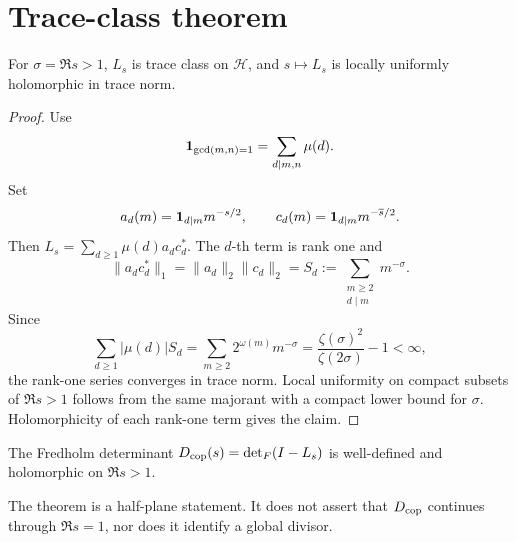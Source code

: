 \section{Trace-class theorem}

\begin{theorem}
For \(\sigma=\Re s>1\), \(L_s\) is trace class on \(\mathcal H\), and
\(s\mapsto L_s\) is locally uniformly holomorphic in trace norm.
\end{theorem}

\begin{proof}
Use
\[
\mathbf{1}_{\operatorname{gcd}(m,n)=1}=\sum_{d\mid m,n}\mu(d).
\]
Set
\[
a_d(m)=\mathbf{1}_{d\mid m}m^{-s/2},\qquad
c_d(m)=\mathbf{1}_{d\mid m}m^{-\overline{s}/2}.
\]
Then \(L_s=\sum_{d\geq1}\mu(d)a_dc_d^*\).  The \(d\)-th term is rank one and
\[
\lVert a_dc_d^*\rVert_1
=\lVert a_d\rVert_2\lVert c_d\rVert_2
=S_d:=\sum_{\substack{m\geq2\\d\mid m}}m^{-\sigma}.
\]
Since
\[
\sum_{d\geq1}|\mu(d)|S_d
=\sum_{m\geq2}2^{\omega(m)}m^{-\sigma}
=\frac{\zeta(\sigma)^2}{\zeta(2\sigma)}-1<\infty,
\]
the rank-one series converges in trace norm.  Local uniformity on compact
subsets of \(\Re s>1\) follows from the same majorant with a compact lower
bound for \(\sigma\).  Holomorphicity of each rank-one term gives the claim.
\end{proof}

\begin{corollary}
The Fredholm determinant \(D_{\mathrm{cop}}(s)=\operatorname{det}_{F}(I-L_s)\) is well-defined and
holomorphic on \(\Re s>1\).
\end{corollary}

\begin{remark}
The theorem is a half-plane statement.  It does not assert that \(D_{\mathrm{cop}}\)
continues through \(\Re s=1\), nor does it identify a global divisor.
\end{remark}
